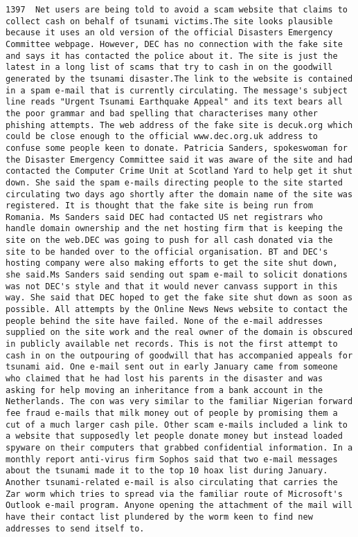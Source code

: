 \documentclass[11pt]{article}
\begin{document}
\begin{Verbatim}[commandchars=\\\{\}]
         1397  Net users are being told to avoid a scam website that claims to collect cash on behalf of tsunami victims.The site looks plausible because it uses an old version of the official Disasters Emergency Committee webpage. However, DEC has no connection with the fake site and says it has contacted the police about it. The site is just the latest in a long list of scams that try to cash in on the goodwill generated by the tsunami disaster.The link to the website is contained in a spam e-mail that is currently circulating. The message's subject line reads "Urgent Tsunami Earthquake Appeal" and its text bears all the poor grammar and bad spelling that characterises many other phishing attempts. The web address of the fake site is decuk.org which could be close enough to the official www.dec.org.uk address to confuse some people keen to donate. Patricia Sanders, spokeswoman for the Disaster Emergency Committee said it was aware of the site and had contacted the Computer Crime Unit at Scotland Yard to help get it shut down. She said the spam e-mails directing people to the site started circulating two days ago shortly after the domain name of the site was registered. It is thought that the fake site is being run from Romania. Ms Sanders said DEC had contacted US net registrars who handle domain ownership and the net hosting firm that is keeping the site on the web.DEC was going to push for all cash donated via the site to be handed over to the official organisation. BT and DEC's hosting company were also making efforts to get the site shut down, she said.Ms Sanders said sending out spam e-mail to solicit donations was not DEC's style and that it would never canvass support in this way. She said that DEC hoped to get the fake site shut down as soon as possible. All attempts by the Online News News website to contact the people behind the site have failed. None of the e-mail addresses supplied on the site work and the real owner of the domain is obscured in publicly available net records. This is not the first attempt to cash in on the outpouring of goodwill that has accompanied appeals for tsunami aid. One e-mail sent out in early January came from someone who claimed that he had lost his parents in the disaster and was asking for help moving an inheritance from a bank account in the Netherlands. The con was very similar to the familiar Nigerian forward fee fraud e-mails that milk money out of people by promising them a cut of a much larger cash pile. Other scam e-mails included a link to a website that supposedly let people donate money but instead loaded spyware on their computers that grabbed confidential information. In a monthly report anti-virus firm Sophos said that two e-mail messages about the tsunami made it to the top 10 hoax list during January. Another tsunami-related e-mail is also circulating that carries the Zar worm which tries to spread via the familiar route of Microsoft's Outlook e-mail program. Anyone opening the attachment of the mail will have their contact list plundered by the worm keen to find new addresses to send itself to.                                                                                                                                                                                            
\end{Verbatim}
\end{document}
